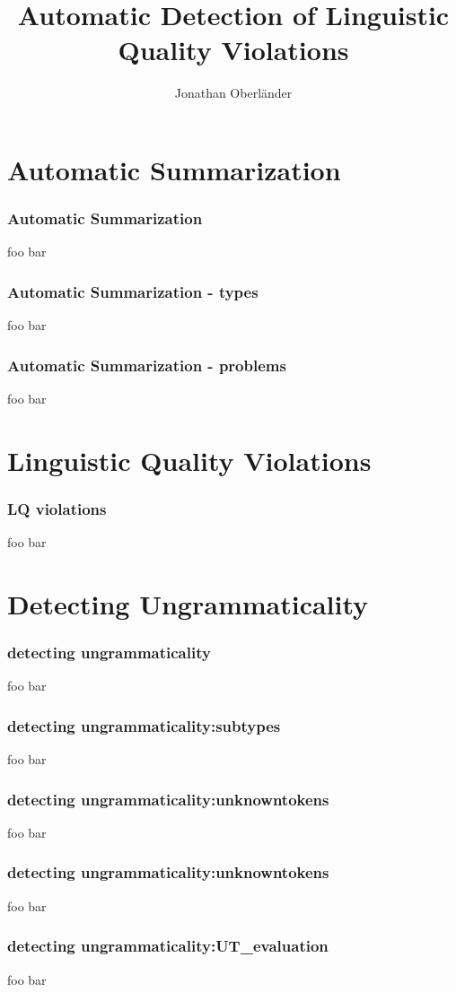 \documentclass{beamer}
\author{Jonathan Oberländer}
\title[Automatic Detection of LQ Violations\hspace{3em}\insertframenumber]{Automatic Detection of Linguistic Quality Violations} %
\date{}
\institute{Jonathan Oberländer\\Universität des Saarlandes\\21.08.2014}
\begin{document}
\maketitle

\section{Automatic Summarization}

\begin{frame}
  \frametitle{Automatic Summarization}
  foo bar
\end{frame}

\begin{frame}
  \frametitle{Automatic Summarization - types}
  foo bar
\end{frame}

\begin{frame}
  \frametitle{Automatic Summarization - problems}
  foo bar
\end{frame}

\section{Linguistic Quality Violations}
\begin{frame}
  \frametitle{LQ violations}
  foo bar
\end{frame}

\section{Detecting Ungrammaticality}
\begin{frame}
  \frametitle{detecting ungrammaticality}
  foo bar
\end{frame}

\begin{frame}
  \frametitle{detecting ungrammaticality:subtypes}
  foo bar
\end{frame}

\begin{frame}
  \frametitle{detecting ungrammaticality:unknowntokens}
  foo bar
\end{frame}

\begin{frame}
  \frametitle{detecting ungrammaticality:unknowntokens}
  foo bar
\end{frame}

\begin{frame}
  \frametitle{detecting ungrammaticality:UT_evaluation}
  foo bar
\end{frame}
\end{document}
